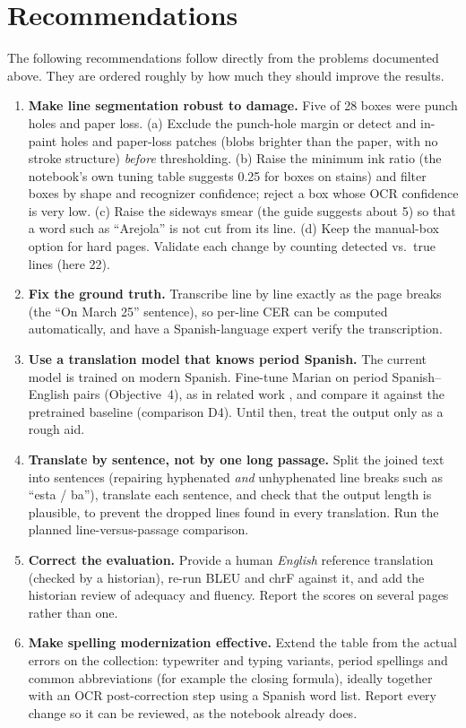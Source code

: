 \documentclass[10pt,twocolumn]{article}
\begin{document}
\section{Recommendations}
The following recommendations follow directly from the problems documented above. They are ordered roughly by how much they should improve the results.
\begin{enumerate}
  \item \textbf{Make line segmentation robust to damage.} Five of 28 boxes were punch holes and paper loss. (a) Exclude the punch-hole margin or detect and in-paint holes and paper-loss patches (blobs brighter than the paper, with no stroke structure) \emph{before} thresholding. (b) Raise the minimum ink ratio (the notebook's own tuning table suggests 0.25 for boxes on stains) and filter boxes by shape and recognizer confidence; reject a box whose OCR confidence is very low. (c) Raise the sideways smear (the guide suggests about 5) so that a word such as ``Arejola'' is not cut from its line. (d) Keep the manual-box option for hard pages. Validate each change by counting detected vs.\ true lines (here 22).
  \item \textbf{Fix the ground truth.} Transcribe line by line exactly as the page breaks (the ``On March 25'' sentence), so per-line CER can be computed automatically, and have a Spanish-language expert verify the transcription.
  \item \textbf{Use a translation model that knows period Spanish.} The current model is trained on modern Spanish. Fine-tune Marian on period Spanish--English pairs (Objective~4), as in related work \cite{puranik}, and compare it against the pretrained baseline (comparison D4). Until then, treat the output only as a rough aid.
  \item \textbf{Translate by sentence, not by one long passage.} Split the joined text into sentences (repairing hyphenated \emph{and} unhyphenated line breaks such as ``esta / ba''), translate each sentence, and check that the output length is plausible, to prevent the dropped lines found in every translation. Run the planned line-versus-passage comparison.
  \item \textbf{Correct the evaluation.} Provide a human \emph{English} reference translation (checked by a historian), re-run BLEU and chrF against it, and add the historian review of adequacy and fluency. Report the scores on several pages rather than one.
  \item \textbf{Make spelling modernization effective.} Extend the table from the actual errors on the collection: typewriter and typing variants, period spellings and common abbreviations (for example the closing formula), ideally together with an OCR post-correction step using a Spanish word list. Report every change so it can be reviewed, as the notebook already does.

\end{enumerate}
\end{document}
